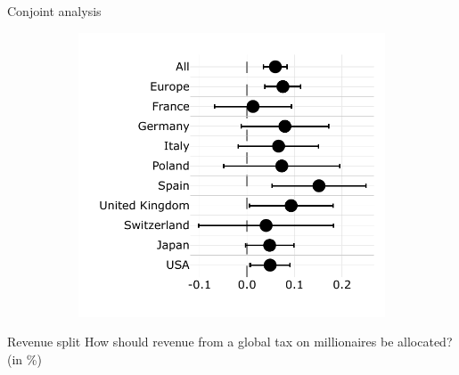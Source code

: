 \documentclass[aspectratio=169,xcolor=dvipsnames, 11pt,mathserif]{beamer}
\begin{document}
\begin{frame}{Conjoint analysis}
\begin{figure}
\begin{subfigure}{.50\textwidth}
  \includegraphics[width=.95\textwidth]{../figures/country_comparison/program_preferred_by_millionaire_tax_in_program.pdf}
\end{subfigure}
\end{figure}
\end{frame}

\begin{frame}{Revenue split}
\centering How should revenue from a global tax on millionaires be allocated? (in \%) \quad {}
\end{frame}
\end{document}
